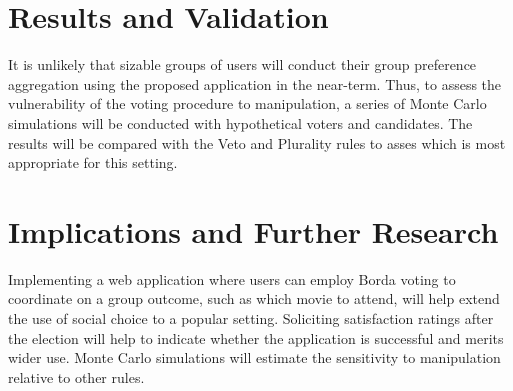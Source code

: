 \documentclass{article}
\begin{document}


\section{Results and Validation}


It is unlikely that sizable groups of users will conduct their group preference aggregation using the proposed application in the near-term. Thus, to assess the vulnerability of the voting procedure to manipulation, a series of Monte Carlo simulations will be conducted with hypothetical voters and candidates. The results will be compared with the Veto and Plurality rules to asses which is most appropriate for this setting.

\section{Implications and Further Research}

Implementing a web application where users can employ Borda voting to coordinate on a group outcome, such as which movie to attend, will help extend the use of social choice to a popular setting. Soliciting satisfaction ratings after the election will help to indicate whether the application is successful and merits wider use. Monte Carlo simulations will estimate the sensitivity to manipulation relative to other rules. 


\begingroup
\renewcommand{\section}[2]{}

\

\endgroup
\end{document}

